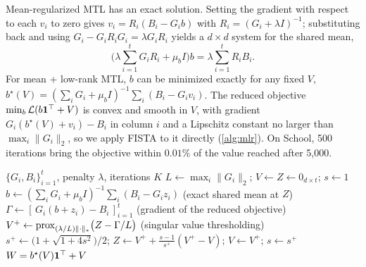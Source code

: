 Mean-regularized MTL has an exact solution. Setting the gradient with respect to each $v_i$ to zero gives $v_i = R_i (B_i - G_i b)$ with $R_i = (G_i + \lambda I)^{-1}$; substituting back and using $G_i - G_i R_i G_i = \lambda G_i R_i$ yields a $d \times d$ system for the shared mean,
\begin{equation}
  \Big( \lambda \sum_{i=1}^{t} G_i R_i + \mu_b I \Big) b = \lambda \sum_{i=1}^{t} R_i B_i .
  \label{eq:meanreg}
\end{equation}
For mean + low-rank MTL, $b$ can be minimized exactly for any fixed $V$, $b^\star(V) = (\sum_i G_i + \mu_b I)^{-1} \sum_i (B_i - G_i v_i)$. The reduced objective $\min_b \mathcal{L}(b\mathbf{1}^\top + V)$ is convex and smooth in $V$, with gradient $G_i (b^\star(V) + v_i) - B_i$ in column $i$ and a Lipschitz constant no larger than $\max_i \lVert G_i \rVert_2$, so we apply FISTA to it directly (\cref{alg:mlr}). On School, 500 iterations bring the objective within $0.01\%$ of the value reached after 5,000.

\begin{algorithm}[t]
\caption{Mean + low-rank MTL by FISTA on the reduced objective}
\label{alg:mlr}
\begin{algorithmic}[1]
\REQUIRE $\{G_i, B_i\}_{i=1}^{t}$, penalty $\lambda$, iterations $K$
\STATE $L \leftarrow \max_i \lVert G_i \rVert_2$; \; $V \leftarrow Z \leftarrow 0_{d \times t}$; \; $s \leftarrow 1$
  \STATE $b \leftarrow (\sum_i G_i + \mu_b I)^{-1} \sum_i (B_i - G_i z_i)$ \hfill (exact shared mean at $Z$)
  \STATE $\Gamma \leftarrow [\,G_i (b + z_i) - B_i\,]_{i=1}^{t}$ \hfill (gradient of the reduced objective)
  \STATE $V^{+} \leftarrow \operatorname{prox}_{(\lambda/L) \lVert \cdot \rVert_*}\!\big(Z - \Gamma / L\big)$ \hfill (singular value thresholding)
  \STATE $s^{+} \leftarrow \big(1 + \sqrt{1 + 4 s^2}\big)/2$; \; $Z \leftarrow V^{+} + \frac{s - 1}{s^{+}} (V^{+} - V)$; \; $V \leftarrow V^{+}$; \; $s \leftarrow s^{+}$
\ENDFOR
\ENSURE $W = b^\star(V) \mathbf{1}^\top + V$
\end{algorithmic}
\end{algorithm}
